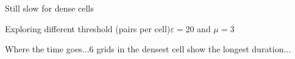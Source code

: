 \documentclass{beamer}
\begin{document}
\begin{frame}{Still slow for dense cells}
\begin{frame}{Exploring different threshold (pairs per cell)}{$\varepsilon=20$ and $\mu=3$}
\begin{frame}{Where the time goes...}{6 grids in the densest cell show the longest duration...}
        \centering
\end{frame}


\end{frame}
\end{frame}
\end{document}
